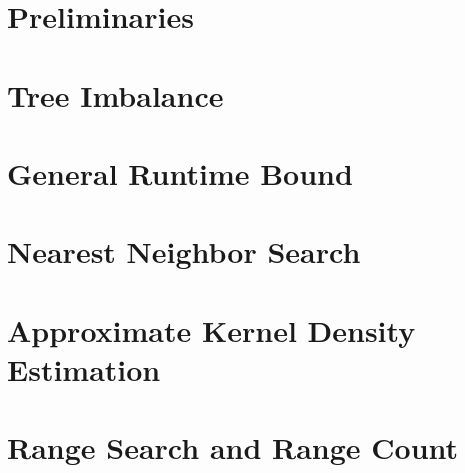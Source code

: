 \documentclass[twoside,11pt]{article} %
\begin{document}
\section{Preliminaries}
\label{sec:preliminaries}



\section{Tree Imbalance}
\label{sec:imbalance}



\section{General Runtime Bound}
\label{sec:bound}



\section{Nearest Neighbor Search}
\label{sec:nns}



\section{Approximate Kernel Density Estimation}
\label{sec:akde}



\section{Range Search and Range Count}
\label{sec:rs}




%

\end{document}
